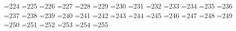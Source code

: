 %
%
% 
%
=224 %
{}=225 %
{}=226 %
{}=227 %
{}=228 %
{}=229 %
{}=230 %
{}=231 %
{}=232 %
{}=233 %
{}=234 %
{}=235 %
{}=236 %
{}=237 %
{}=238 %
{}=239 %
{}=240 %
{}=241 %
{}=242 %
{}=243 %
{}=244 %
{}=245 %
{}=246 %
{}=247 %
{}=248 %
{}=249 %
{}=250 %
{}=251 %
{}=252 %
{}=253 %
{}=254 %
{}=255 %
